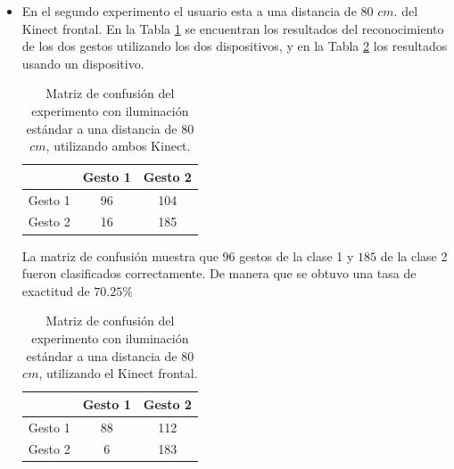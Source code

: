 \begin{itemize}
La matriz de confusión muestra que $127$ gestos de la clase 1 y $194$ de la clase 2 fueron clasificados correctamente. De manera que se obtuvo una tasa de exactitud de $80.25\%$ 

Como se observa en las matrices de confusión, se obtiene una mayor exactitud en el reconocimiento del gesto utilizando dos dispositivos Kinect.


\item En el segundo experimento el usuario esta a una distancia de $80$ $cm.$ del Kinect frontal. En la Tabla \ref{table:80LK2} se encuentran los resultados del reconocimiento de los dos gestos utilizando los dos dispositivos, y en la Tabla \ref{table:80LK1} los resultados usando un dispositivo.   


\begin{table}[h!] 
\begin{center}
\begin{tabular}{ r || c | c |} 
        & Gesto 1 & Gesto 2 \\ \hline \hline  
Gesto 1 & 96     &  104     \\ \hline  
Gesto 2 & 16     & 185     \\   
\end{tabular}
\end{center} 
\caption{Matriz de confusión del experimento con iluminación estándar a una distancia de $80$ $cm$, utilizando ambos Kinect.} 
\label{table:80LK2}
\end{table}

La matriz de confusión muestra que $96$ gestos de la clase 1 y $185$ de la clase 2 fueron clasificados correctamente. De manera que se obtuvo una tasa de exactitud de $70.25\%$  

\begin{table}[h!] 
\begin{center}
\begin{tabular}{ r || c | c |}  
        & Gesto 1 & Gesto 2 \\ \hline \hline  
Gesto 1 & 88     &  112     \\ \hline  
Gesto 2 & 6     & 183     \\   
\end{tabular}
\end{center} 
\caption{Matriz de confusión del experimento con iluminación estándar a una distancia de $80$ $cm$, utilizando el Kinect frontal.} 
\label{table:80LK1}
\end{table}  


\end{itemize}
